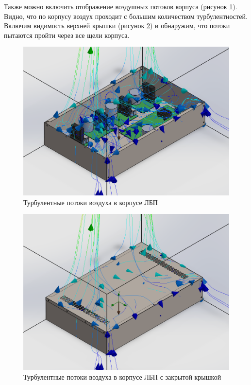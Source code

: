 \documentclass[utf8x, 14pt, oneside, a4paper]{article}
\begin{document}
		Также можно включить отображение воздушных потоков корпуса (рисунок \ref{fig:solid-bp-flow}). Видно, что по корпусу воздух проходит с большим количеством турбулентностей. Включим видимость верхней крышки (рисунок \ref{fig:solid-bp-flow-top}) и обнаружим, что потоки пытаются пройти через все щели корпуса.
		
		\begin{figure}[H]
			\centering
			\includegraphics[width=0.8\linewidth]{"Рисунки/Solid-bp-flow"}
			\caption{Турбулентные потоки воздуха в корпусе ЛБП}
			\label{fig:solid-bp-flow}
		\end{figure}
	
		\begin{figure}[H]
			\centering
			\includegraphics[width=0.8\linewidth]{"Рисунки/Solid-bp-flow-top"}
			\caption{Турбулентные потоки воздуха в корпусе ЛБП с закрытой крышкой}
			\label{fig:solid-bp-flow-top}
		\end{figure}
		
	
\end{document}
